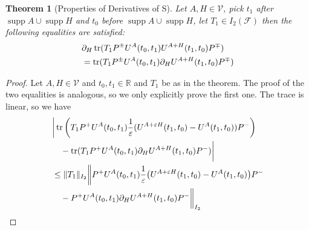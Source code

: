 \documentclass[b5paper,draft,openbib,12pt]{memoir}
\newtheorem{Thm}[Def]{Theorem}
\DeclareMathOperator*{\supp}{supp}
\DeclareMathOperator{\tr}{tr}
\begin{document}
\begin{Thm}[Properties of Derivatives of S]
Let  \(A,H\in\mathcal{V}\), pick \(t_1\) 
after \(\supp A\cup\supp H\) and \(t_0\)
before \(\supp A\cup\supp H\), 
let \(T_1\in I_2(\mathcal{F})\) 
then the following equalities are satisfied:
\begin{align}\notag
&\partial_{H} \tr(T_1 P^\pm U^{A}(t_0,t_1)U^{A+H}(t_1,t_0)P^\mp)\\\label{pull derivative into trace}
&= \tr(T_1 P^\pm U^{A}(t_0,t_1)\partial_{H} U^{A+H}(t_1,t_0)P^\mp )
\end{align}
\end{Thm}
\begin{proof}
Let \(A,H\in\mathcal{V}\) and \(t_0,t_1\in\mathbb{R}\)
and \(T_1\) be 
as in the theorem. The proof of the two equalities is 
analogous, so we only explicitly prove the first one.
The trace is linear, so we have
\begin{align}\notag
&\bigg|
\tr\left(T_1 P^+ U^{A}(t_0,t_1) 
\frac{1}{\varepsilon}(U^{A+\varepsilon H}(t_1,t_0)-U^{A}(t_1,t_0))P^-\right)\\
&\quad- \tr(T_1 P^+ U^{A}(t_0,t_1)\partial_{H}U^{A+H}(t_1,t_0)P^-)\bigg|\\\notag
&\le \|T_1\|_{I_2} \bigg\|  P^+ U^{A}(t_0,t_1) 
\frac{1}{\varepsilon}\big(U^{A+\varepsilon H}(t_1,t_0)-U^{A}(t_1,t_0)\big)P^- \\\label{derivative trace estimate}
&\quad-P^+ U^{A}(t_0,t_1)\partial_{H}U^{A+H}(t_1,t_0)P^-\bigg\|_{I_2}
\end{align}


\end{proof}
\end{document}
